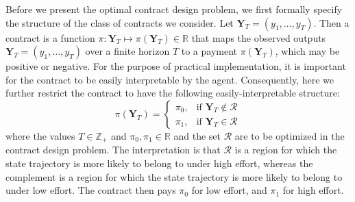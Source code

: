 \documentclass[letterpaper, 10 pt, conference]{ieeeconf}  %
\begin{document}
Before we present the optimal contract design problem, we first formally specify the structure of the class of contracts we consider. Let $\mathbf{Y}_T = (y_1,\ldots,y_T)$. Then a contract is a function $\pi: \mathbf{Y}_T \mapsto \pi(\mathbf{Y}_T) \in \mathbb{R}$ that maps the observed outputs $\mathbf{Y}_T = (y_1,\ldots,y_T)$ over a finite horizon $T$ to a payment $\pi(\mathbf{Y}_T)$, which may be positive or negative. 
For the purpose of practical implementation, it is important for the contract to be easily interpretable by the agent. Consequently, here we further restrict the contract to have the following easily-interpretable structure:
\begin{equation}
\pi(\mathbf{Y}_T) = \begin{cases} \pi_0, & \text{if } \mathbf{Y}_T \notin \mathcal{R} \\ \pi_1, & \text{if } \mathbf{Y}_T \in \mathcal{R} 
\end{cases}
\end{equation}
where the values $T \in\mathbb{Z}_{+}$ and $\pi_0,\pi_1 \in \mathbb{R}$ and the set $\mathcal{R}$ are to be optimized in the contract design problem. The interpretation is that $\mathcal{R}$ is a region for which the state trajectory is more likely to belong to under high effort, whereas the complement is a region for which the state trajectory is more likely to belong to under low effort. The contract then pays $\pi_0$ for low effort, and $\pi_1$ for high effort.
\end{document}

